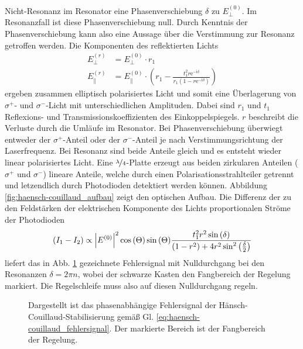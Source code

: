Nicht-Resonanz im Resonator eine Phasenverschiebung $\delta$ zu $E_{\perp}^{(0)}$. Im Resonanzfall ist diese Phasenverschiebung null. Durch Kenntnis der Phasenverschiebung kann also eine Aussage über die Verstimmung zur Resonanz getroffen werden. Die
Komponenten des reflektierten Lichts
\begin{equation}\label{eq:haensch-couillaud_02}
	\begin{split}
		E_{\perp}^{(r)} & = E_{\perp}^{(0)}\cdot r_1\\
		E_{\parallel}^{(r)} & = E_{\parallel}^{(0)}\cdot\left(r_1-\frac{t_1^2r\mathrm{e}^{-\mathrm{i}\delta}}{r_1\left(1-r\mathrm{e}^{-\mathrm{i}\delta}\right)}\right)
	\end{split}
\end{equation}
ergeben zusammen elliptisch polarisiertes Licht und somit eine Überlagerung von
$\sigma^+$- und $\sigma^-$-Licht mit unterschiedlichen Amplituden. Dabei sind
$r_1$ und $t_1$ Reflexions- und Transmissionskoeffizienten des
Einkoppelspiegels. $r$ beschreibt die Verluste durch die Umläufe im Resonator.
Bei Phasenverschiebung überwiegt entweder der $\sigma^+$-Anteil oder der
$\sigma^-$-Anteil je nach Verstimmungsrichtung der Laserfrequenz.
Bei Resonanz sind beide Anteile gleich und es entsteht wieder linear polarisiertes Licht. Eine $\nicefrac{\lambda}{4}$-Platte erzeugt aus beiden zirkularen Anteilen ($\sigma^+$ und $\sigma^-$) lineare Anteile, welche durch einen Polarisationsstrahlteiler getrennt und letzendlich durch Photodioden
detektiert werden können. Abbildung \ref{fig:haensch-couillaud_aufbau} zeigt den
optischen Aufbau. Die Differenz der zu den Feldstärken der elektrischen Komponente
des Lichts proportionalen Ströme der Photodioden
\begin{equation}\label{eq:haensch-couillaud_fehlersignal}
	(I_1-I_2)\propto\left|E^{(0)}\right|^2\cos{(\Theta)}\sin{(\Theta)}\frac{t_1^2r^2\sin{(\delta)}}{(1-r^2)+4r^2\sin^2{\left(\frac{\delta}{2}\right)}}
\end{equation}
liefert das in Abb. \ref{fig:haensch-couillaud_fehlersignal} gezeichnete
Fehlersignal mit Nulldurchgang bei den Resonanzen $\delta=2\pi n$, wobei der
schwarze Kasten den Fangbereich der Regelung markiert. Die Regelschleife muss
also auf diesen Nulldurchgang regeln.
\begin{figure}[h]
	\centering
	\footnotesize
	
	\caption[Hänsch-Couillaud - Fehlersignal]{Dargestellt ist das
	phasenabhängige Fehlersignal der Hänsch-Couillaud-Stabilisierung
	gemäß Gl.
	\eqref{eq:haensch-couillaud_fehlersignal}.
	Der markierte Bereich ist der
	Fangbereich der Regelung.}\label{fig:haensch-couillaud_fehlersignal}
\end{figure}

